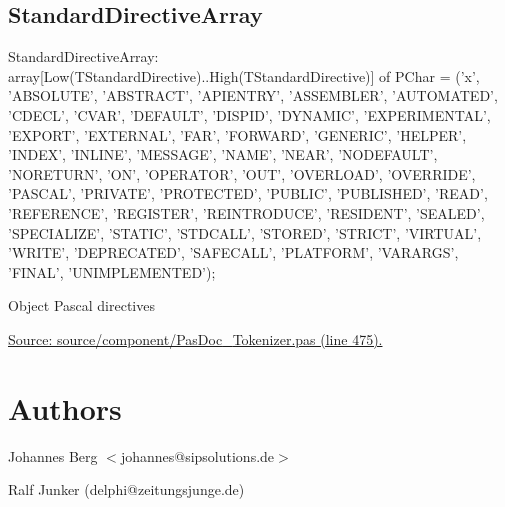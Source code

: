 \documentclass{report}
\newif\ifpdf
\begin{document}
\subsection*{StandardDirectiveArray}
\fi
\label{PasDoc_Tokenizer-StandardDirectiveArray}
\begin{list}{}{
\setlength{\itemindent}{0cm}
\setlength{\listparindent}{0cm}
\setlength{\leftmargin}{\evensidemargin}
\addtolength{\leftmargin}{\tmplength}
\settowidth{\labelsep}{X}
\addtolength{\leftmargin}{\labelsep}
\setlength{\labelwidth}{\tmplength}
}
\item[\textbf{Declaration}\hfill]
\ifpdf
\begin{flushleft}
\fi
\begin{ttfamily}
StandardDirectiveArray:
    array[Low(TStandardDirective)..High(TStandardDirective)] of PChar =
  ('x', 
    'ABSOLUTE', 'ABSTRACT', 'APIENTRY', 'ASSEMBLER', 'AUTOMATED',
    'CDECL', 'CVAR', 'DEFAULT', 'DISPID', 'DYNAMIC', 'EXPERIMENTAL', 'EXPORT', 'EXTERNAL',
    'FAR', 'FORWARD', 'GENERIC', 'HELPER', 'INDEX', 'INLINE', 'MESSAGE', 'NAME', 'NEAR',
    'NODEFAULT', 'NORETURN', 'ON', 'OPERATOR', 'OUT', 'OVERLOAD', 'OVERRIDE', 'PASCAL', 'PRIVATE',
    'PROTECTED', 'PUBLIC', 'PUBLISHED', 'READ', 'REFERENCE', 'REGISTER',
    'REINTRODUCE', 'RESIDENT', 'SEALED', 'SPECIALIZE', 'STATIC',
    'STDCALL', 'STORED', 'STRICT', 'VIRTUAL',
    'WRITE', 'DEPRECATED', 'SAFECALL', 'PLATFORM', 'VARARGS', 'FINAL',
    'UNIMPLEMENTED');\end{ttfamily}

\ifpdf
\end{flushleft}
\fi

\par
\item[\textbf{Description}]
Object Pascal directives\par
\href{https://github.com/pasdoc/pasdoc/blob/master/source/component/PasDoc_Tokenizer.pas#L475}{Source: source/component/PasDoc{\_}Tokenizer.pas (line 475).}

\end{list}
\section{Authors}
\par
Johannes Berg {$<$}johannes@sipsolutions.de{$>$}

\par
Ralf Junker (delphi@zeitungsjunge.de)
\end{document}
